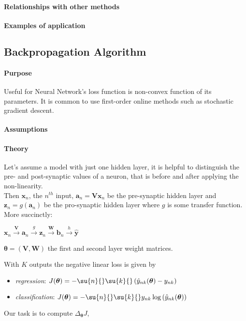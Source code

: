 \paragraph{Relationships with other methods}
\paragraph{Examples of application}


\subsection{Backpropagation Algorithm}
\paragraph{Purpose}
Useful for Neural Network's loss function is non-convex function of its parameters. 
It is common to use first-order online methods such as stochastic gradient descent.
\paragraph{Assumptions}
\paragraph{Theory}
Let's assume a model with just one hidden layer, it is helpful to distinguish the pre- and 
post-synaptic values of a neuron, that is before and after applying the non-linearity.\\
Then $\bm{x}_{n}$, the $n^{th}$ input, $\bm{a}_{n} = \bm{V}\bm{x}_{n}$ be the pre-synaptic hidden
layer and $\bm{z}_{n} = g(\bm{a}_{n})$ be the pro-synaptic hidden layer where $g$ is some transfer
function. More succinctly:
\begin{center}
    $\bm{x}_{n} \xrightarrow{\bm{V}} \bm{a}_{n} \xrightarrow{g} \bm{z}_{n} \xrightarrow{\bm{W}}
    \bm{b}_{n} \xrightarrow{h} \hat{\bm{y}}$
\end{center}
$\bm{\theta}=\left(\bm{V},\bm{W}\right)$ the first and second layer weight matrices.

With $K$ outputs the negative linear loss is given by
\begin{itemize}
    \item \emph{regression}: $J(\bm{\theta})=-\su{n}{}\su{k}{}\left(\hat{y}_{nk}(\bm{\theta})-y_{nk}
        \right)$
    \item \emph{classification}: $J(\bm{\theta})=-\su{n}{}\su{k}{}y_{nk}\log\left(\hat{y}_{nk}(\bm{
            \theta})\right)$
\end{itemize}
Our task is to compute $\Delta_{\bm{\theta}}J$, 

